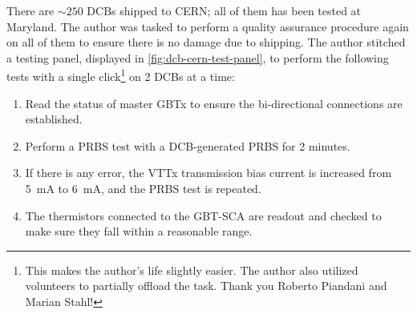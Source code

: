There are $\sim 250$ DCBs shipped to CERN;
all of them has been tested at Maryland.
The author was tasked to perform a quality assurance procedure again on all of
them to ensure there is no damage due to shipping.
The author stitched a testing panel,
displayed in \cref{fig:dcb-cern-test-panel},
to perform the following tests with a single click\footnote{
    This makes the author's life slightly easier.
    The author also utilized volunteers to partially offload the task.
    Thank you Roberto Piandani and Marian Stahl!
} on 2 DCBs at a time:

\begin{enumerate}
    \item Read the status of master GBTx to ensure the bi-directional
        connections are established.

    \item Perform a PRBS test with a DCB-generated PRBS for 2 minutes.
    \item If there is any error, the VTTx transmission bias current is
        increased from 5~mA to 6~mA, and the PRBS test is repeated.
    \item The thermistors connected to the GBT-SCA are readout and checked
        to make sure they fall within a reasonable range.
\end{enumerate}

